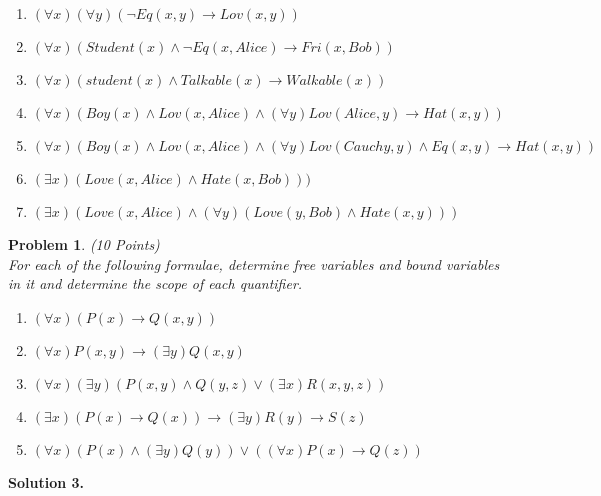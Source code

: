 \documentclass[10pt]{article}
\newtheorem{myprob}{Problem}
\begin{document}
\begin{enumerate}
	\item
	$(\forall x)(\forall y)(\neg Eq(x,y)\rightarrow Lov(x,y))$
	\item
	$(\forall x)(Student(x)\wedge \neg Eq(x,Alice)\rightarrow Fri(x,Bob))$
	\item
	$(\forall x)(student(x)\wedge Talkable(x)\rightarrow Walkable(x))$
	\item
	$(\forall x)(Boy(x)\wedge Lov(x,Alice)\wedge (\forall y) Lov(Alice,y)\rightarrow Hat(x,y))$
	\item
	$(\forall x)(Boy(x)\wedge Lov(x,Alice)\wedge (\forall y) Lov(Cauchy,y)\wedge Eq(x,y) \rightarrow Hat(x,y))$
	\item
	$(\exists x)(Love(x,Alice)\wedge Hate(x,Bob)))$
	\item
	$(\exists x)(Love(x,Alice)\wedge (\forall y)(Love(y,Bob)\wedge Hate(x,y)))$

\end{enumerate}
	\begin{myprob}  (10 Points)\\ \upshape
		For each of the following formulae, determine   free variables and   bound variables in it and determine the scope of each quantifier. \vspace{-5pt}
		\begin{enumerate}
			\item
			$(\forall x)(P(x)\to Q(x,y))$\vspace{-5pt}
			\item
			$(\forall x)P(x,y)\to (\exists y)Q(x,y)$ \vspace{-5pt}
			\item
			$(\forall x)(\exists y)( P(x,y)\wedge Q(y,z)\vee (\exists x)R(x,y,z) )$\vspace{-5pt}
			\item
			$(\exists x)( P(x)\to Q(x) ) \to (\exists y)R(y) \to S(z)$\vspace{-5pt}
			\item
			$(\forall x)( P(x)\wedge (\exists y)Q(y))\vee((\forall x)P(x)\to Q(z))   $
		\end{enumerate}
	\end{myprob}

\noindent\textbf{Solution 3.}
\end{document}
